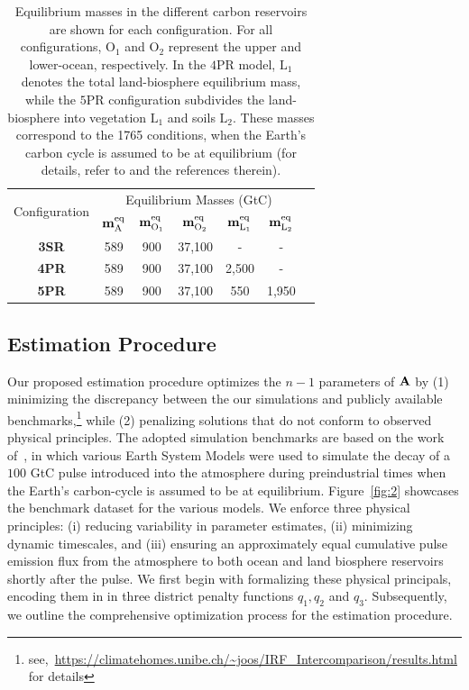 \documentclass[11pt, a4paper, pdftex, twoside, dvipsnames]{article}
\renewcommand{\ref}{\cref}
\newcommand{\bb}[1]{\boldsymbol{\bold{#1}}}
\begin{document}
\begin{table}[t]
\centering
\small
\begin{tabular}{ccccccc}
\multirow{2}{*}{Configuration} & 
\multicolumn{5}{c}{Equilibrium Masses (GtC) \vspace{0.2em}}\\   &
$\bb{m}_{\text{A}}^{{\text{eq}}} $&
$\bb{m}_{\text{O}_1}^{{\text{eq}}}$&
$\bb{m}_{\text{O}_2}^{{\text{eq}}}$&
$\bb{m}_{\text{L}_1}^{{\text{eq}}}$&
$\bb{m}_{\text{L}_2}^{{\text{eq}}}$& \vspace{0.5em}\\
%
\toprule
\toprule
\textbf{3SR} & 
    589 & 900 & 37,100 & - & - \\
    \textbf{4PR} & 
    589 & 900 & 37,100 & 2,500 & - \\
    \textbf{5PR} & 
    589 & 900 & 37,100 & 550 & 1,950 \\
\end{tabular}
\label{tab:1}
\caption{Equilibrium masses in the different carbon reservoirs are shown for each configuration. For all configurations, $\text{O}_1$ and $\text{O}_2$ represent the upper and lower-ocean, respectively. In the $4$PR model, $\text{L}_1$ denotes the total land-biosphere equilibrium mass, while the $5$PR configuration subdivides the land-biosphere into vegetation $\text{L}_1$ and soils $\text{L}_2$. These masses correspond to the 1765 conditions, when the Earth's carbon cycle is assumed to be at equilibrium (for details, refer to \cite{2431585063dd4b78b890f885bb19642e} and the references therein).
    }
\label{tab:1}
\end{table}



\subsection{Estimation Procedure} 
Our proposed estimation procedure optimizes the $n-1$ parameters of $\bb{A}$ by (1) minimizing the discrepancy between the our simulations and publicly available benchmarks,\footnote{see,~\url{https://climatehomes.unibe.ch/~joos/IRF_Intercomparison/results.html} for details} while (2) penalizing solutions that do not conform to observed physical principles.
The adopted simulation benchmarks are based on the work of~\cite{joos2013carbon}, in which various Earth System Models were used to simulate the decay of a $100$ GtC pulse introduced into the atmosphere during preindustrial times when the Earth's carbon-cycle is assumed to be at equilibrium.
Figure~\ref{fig:2} showcases the benchmark dataset for the various models.
We enforce three physical principles: (i) reducing variability in parameter estimates, (ii) minimizing dynamic timescales, and (iii) ensuring an approximately equal cumulative pulse emission flux from the atmosphere to both ocean and land biosphere reservoirs shortly after the pulse.
We first begin with formalizing these physical principals, encoding them in in three district penalty functions $q_1,q_2$ and $q_3$. 
Subsequently, we outline the comprehensive optimization process for the estimation procedure.
\end{document}
